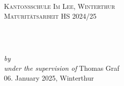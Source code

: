 \begin{titlepage}
    \vspace*{5cm}
    \makeatletter
    \begin{center}
      \textsc{Kantonsschule Im Lee, Winterthur\\Maturitätsarbeit HS 2024/25}\\
      \vspace*{1cm}
      \begin{Huge}
        \@title
      \end{Huge}\\[0.1cm]
      \begin{Large}
        \@subtitle
      \end{Large}\\
      \emph{by}
      \@author\\
      \emph{under the supervision of}
      Thomas Graf\\
      \vfill
      06. January 2025, Winterthur
    \end{center}
    \makeatother
\end{titlepage}
  
\newpage
\null
\thispagestyle{empty}
\newpage
  
